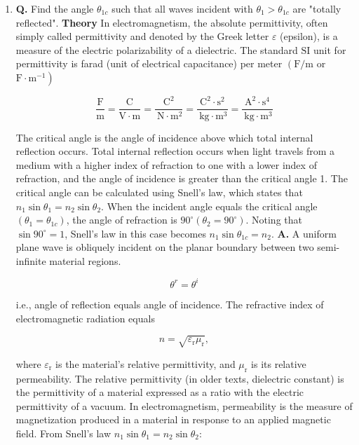 \documentclass[main.tex]{subfiles}
\begin{document}
\begin{enumerate}
    \begin{enumerate}
        \item \textbf{Q.} Find the angle $\theta_{1c}$ such that all waves incident with $\theta_1 > \theta_{1c}$ are "totally reflected". \textbf{Theory} In electromagnetism, the absolute permittivity, often simply called permittivity and denoted by the Greek letter $\varepsilon$ (epsilon), is a measure of the electric polarizability of a dielectric. The standard $\mathrm{SI}$ unit for permittivity is farad (unit of electrical capacitance) per meter $\left(\mathrm{F} / \mathrm{m}\right.$ or $\left.\mathrm{F} \cdot \mathrm{m}^{-1}\right)$

        $$
        \frac{\mathrm{F}}{\mathrm{m}}=\frac{\mathrm{C}}{\mathrm{V} \cdot \mathrm{m}}=\frac{\mathrm{C}^2}{\mathrm{~N} \cdot \mathrm{m}^2}=\frac{\mathrm{C}^2 \cdot \mathrm{s}^2}{\mathrm{~kg} \cdot \mathrm{m}^3}=\frac{\mathrm{A}^2 \cdot \mathrm{s}^4}{\mathrm{~kg} \cdot \mathrm{m}^3}
        $$
                
        The critical angle is the angle of incidence above which total internal reflection occurs. Total internal reflection occurs when light travels from a medium with a higher index of refraction to one with a lower index of refraction, and the angle of incidence is greater than the critical angle 1. The critical angle can be calculated using Snell's law, which states that $n_1 \sin \theta_1=n_2 \sin \theta_2$. When the incident angle equals the critical angle $\left(\theta_1=\theta_{1 c}\right)$, the angle of refraction is $90^{\circ}\left(\theta_2=90^{\circ}\right)$. Noting that $\sin 90^{\circ}=1$, Snell's law in this case becomes $n_1 \sin \theta_{1 c}=n_2$. \textbf{A.} A uniform plane wave is obliquely incident on the planar boundary between two semi-infinite material regions. 
        
        $$
        \theta^r=\theta^i
        $$
        
        i.e., angle of reflection equals angle of incidence. The refractive index of electromagnetic radiation equals
        
        $$
        n=\sqrt{\varepsilon_{\mathrm{r}} \mu_{\mathrm{r}}},
        $$
        
        where $\varepsilon_{\mathrm{r}}$ is the material's relative permittivity, and $\mu_{\mathrm{r}}$ is its relative permeability. The relative permittivity (in older texts, dielectric constant) is the permittivity of a material expressed as a ratio with the electric permittivity of a vacuum. In electromagnetism, permeability is the measure of magnetization produced in a material in response to an applied magnetic field. From Snell's law $n_1 \sin \theta_1=n_2 \sin \theta_2$:
        

\end{enumerate}
\end{enumerate}
\end{document}
